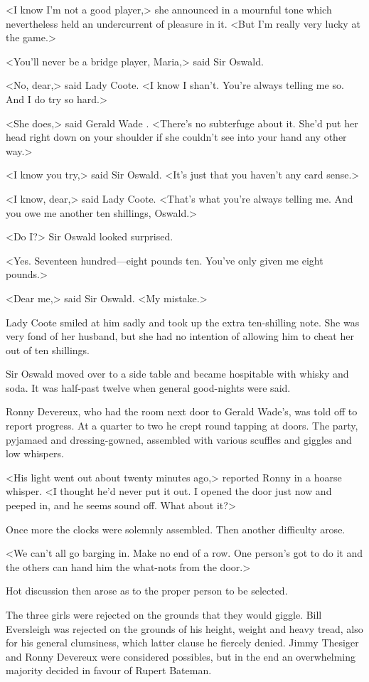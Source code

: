 <I know I'm not a good player,> she announced in a mournful tone which nevertheless held an undercurrent of pleasure in it. <But I'm really very lucky at the game.>

<You'll never be a bridge player, Maria,> said Sir Oswald.

<No, dear,> said Lady Coote. <I know I shan't. You're always telling me so. And I do try so hard.>

<She does,> said Gerald Wade . <There's no subterfuge about it. She'd put her head right down on your shoulder if she couldn't see into your hand any other way.>

<I know you try,> said Sir Oswald. <It's just that you haven't any card sense.>

<I know, dear,> said Lady Coote. <That's what you're always telling me. And you owe me another ten shillings, Oswald.>

<Do I?> Sir Oswald looked surprised.

<Yes. Seventeen hundred—eight pounds ten. You've only given me eight pounds.>

<Dear me,> said Sir Oswald. <My mistake.>

Lady Coote smiled at him sadly and took up the extra ten-shilling note. She was very fond of her husband, but she had no intention of allowing him to cheat her out of ten shillings.

Sir Oswald moved over to a side table and became hospitable with whisky and soda. It was half-past twelve when general good-nights were said.

Ronny Devereux, who had the room next door to Gerald Wade's, was told off to report progress. At a quarter to two he crept round tapping at doors. The party, pyjamaed and dressing-gowned, assembled with various scuffles and giggles and low whispers.

<His light went out about twenty minutes ago,> reported Ronny in a hoarse whisper. <I thought he'd never put it out. I opened the door just now and peeped in, and he seems sound off. What about it?>

Once more the clocks were solemnly assembled. Then another difficulty arose.

<We can't all go barging in. Make no end of a row. One person's got to do it and the others can hand him the what-nots from the door.>

Hot discussion then arose as to the proper person to be selected.

The three girls were rejected on the grounds that they would giggle. Bill Eversleigh was rejected on the grounds of his height, weight and heavy tread, also for his general clumsiness, which latter clause he fiercely denied. Jimmy Thesiger and Ronny Devereux were considered possibles, but in the end an overwhelming majority decided in favour of Rupert Bateman.

